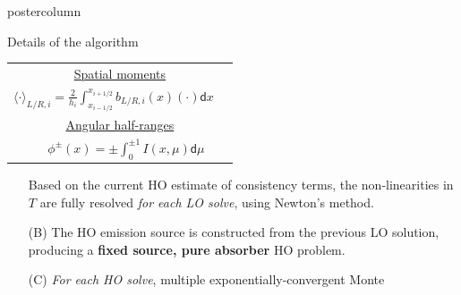 \documentclass[xcolor=dvipsnames]{beamer}
\renewcommand{\d}{\mathsf{d}}
\newcommand{\mom}[1]{\langle #1 \rangle}
\newcommand{\il}{{i-1/2}}
\newcommand{\ir}{{i+1/2}}
\newcommand{\colb}[1]{{\color{blue} #1}}
\begin{document}
\begin{frame}
\begin{columns}
\begin{column}{.49\textwidth}
\begin{beamercolorbox}[center,wd=\textwidth]{postercolumn}
\begin{minipage}[T]{0.95\textwidth}
{\begin{block}{Details of the algorithm}
\begin{minipage}{0.45\textwidth}
{{
    }
}
    \end{minipage}
    \begin{minipage}{0.45\textwidth}
    \begin{center}
        {\small
    \begin{tabular}{c}
        \underline{Spatial moments} \\[1em]
        $ {\displaystyle \mom{\cdot}_{L/R,i} = \frac{2}{h_i} \int_{x_\il}^{x_\ir}
        b_{L/R,i}(x)(\cdot) \d x \quad }$  \\[1em]  \underline{Angular half-ranges}
        \\[1em] ${ \quad \displaystyle \phi^\pm(x) =
        \pm\int_0^{\pm 1} I(x,\mu) \d \mu}$
\end{tabular}}
    \end{center}
\end{minipage}
    \begin{itemize} 
        \setlength\itemsep{0.5em}
        \item[] Based on the current HO estimate of consistency terms,
        the non-linearities in $T$ are fully resolved \emph{for each LO solve}, using \colb{Newton's
method.}    
        \item[(B)] The HO emission source is constructed from the previous LO
            solution, producing a \textbf{fixed source,
            pure absorber} HO
            problem. 
        \item[(C)] \emph{For each HO solve}, multiple exponentially-convergent Monte

\end{itemize}
\end{block}}
\end{minipage}
\end{beamercolorbox}
\end{column}
\end{columns}
\end{frame}
\end{document}
